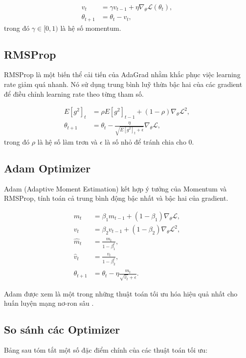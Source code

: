 \begin{align}
    v_{t} &= \gamma v_{t-1} + \eta \nabla_\theta \mathcal{L}(\theta_t), \\
    \theta_{t+1} &= \theta_t - v_{t},
\end{align}
trong đó \( \gamma \in [0,1) \) là hệ số momentum.

\subsection{RMSProp}
RMSProp là một biến thể cải tiến của AdaGrad nhằm khắc phục việc learning rate giảm quá nhanh. Nó sử dụng trung bình luỹ thừa bậc hai của các gradient để điều chỉnh learning rate theo từng tham số.

\begin{align}
    E[g^2]_t &= \rho E[g^2]_{t-1} + (1 - \rho) \nabla_\theta \mathcal{L}^2, \\
    \theta_{t+1} &= \theta_t - \frac{\eta}{\sqrt{E[g^2]_t + \epsilon}} \nabla_\theta \mathcal{L},
\end{align}
trong đó \( \rho \) là hệ số làm trơn và \( \epsilon \) là số nhỏ để tránh chia cho 0.

\subsection{Adam Optimizer}
Adam (Adaptive Moment Estimation) kết hợp ý tưởng của Momentum và RMSProp, tính toán cả trung bình động bậc nhất và bậc hai của gradient.

\begin{align}
    m_t &= \beta_1 m_{t-1} + (1 - \beta_1) \nabla_\theta \mathcal{L}, \\
    v_t &= \beta_2 v_{t-1} + (1 - \beta_2) \nabla_\theta \mathcal{L}^2, \\
    \hat{m}_t &= \frac{m_t}{1 - \beta_1^t}, \\
    \hat{v}_t &= \frac{v_t}{1 - \beta_2^t}, \\
    \theta_{t+1} &= \theta_t - \eta \frac{\hat{m}_t}{\sqrt{\hat{v}_t} + \epsilon}.
\end{align}

Adam được xem là một trong những thuật toán tối ưu hóa hiệu quả nhất cho huấn luyện mạng nơ-ron sâu \cite{kingma2014adam}.

\subsection{So sánh các Optimizer}
Bảng sau tóm tắt một số đặc điểm chính của các thuật toán tối ưu:

